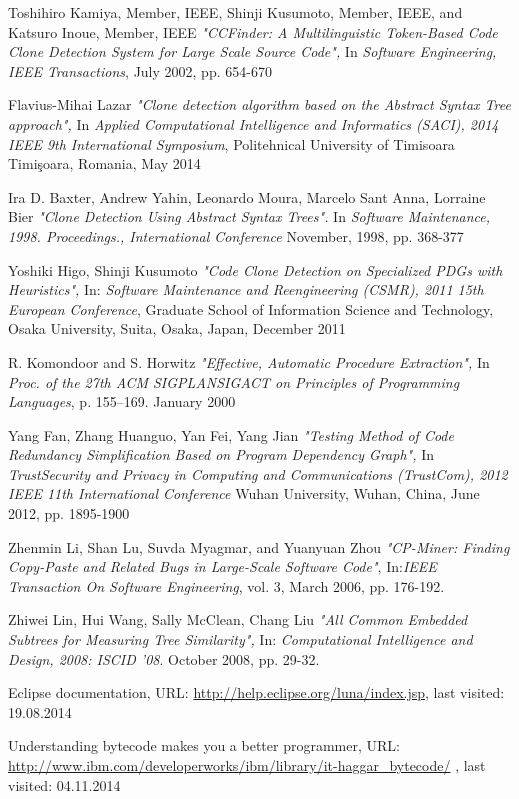 \documentclass{report}
\begin{document}
\begin{thebibliography}{100}
 Toshihiro Kamiya, Member, IEEE, Shinji Kusumoto, Member, IEEE, and Katsuro Inoue, Member, IEEE \emph{"CCFinder: A Multilinguistic Token-Based Code Clone Detection System for Large Scale Source Code",} In \emph{Software Engineering, IEEE Transactions},  July 2002, pp. 654-670

 Flavius-Mihai Lazar \emph{"Clone detection algorithm based on the Abstract Syntax Tree approach",} In \emph{Applied Computational Intelligence and Informatics (SACI), 2014 IEEE 9th International Symposium}, Politehnical University of Timisoara Timişoara, Romania, May 2014

 Ira D. Baxter, Andrew Yahin, Leonardo Moura, Marcelo Sant Anna, Lorraine Bier \emph{"Clone Detection Using Abstract Syntax Trees".} In \emph{Software Maintenance, 1998. Proceedings., International Conference} November, 1998, pp. 368-377

 Yoshiki Higo, Shinji Kusumoto \emph{"Code Clone Detection on Specialized PDGs with Heuristics",} In: \emph{Software Maintenance and Reengineering (CSMR), 2011 15th European Conference}, Graduate School of Information Science and Technology, Osaka University, Suita, Osaka, Japan, December 2011

 R. Komondoor and S. Horwitz \emph{"Effective, Automatic Procedure Extraction",} In \emph{Proc. of the 27th ACM SIGPLANSIGACT
on Principles of Programming Languages}, p. 155–169. January 2000

 Yang Fan, Zhang Huanguo, Yan Fei, Yang Jian \emph{"Testing Method of Code Redundancy Simplification Based on Program Dependency Graph", } 
In \emph{ TrustSecurity and Privacy in Computing and Communications (TrustCom), 2012 IEEE 11th International Conference }
Wuhan University, Wuhan, China, June 2012, pp. 1895-1900 

 Zhenmin Li, Shan Lu, Suvda Myagmar, and Yuanyuan Zhou \emph{"CP-Miner: Finding Copy-Paste and
Related Bugs in Large-Scale Software Code"}, In:\emph{IEEE Transaction On Software Engineering}, vol. 3, March 2006, pp. 176-192.

 Zhiwei Lin, Hui Wang, Sally McClean, Chang Liu \emph{"All Common Embedded Subtrees for Measuring Tree Similarity",} In:
\emph{Computational Intelligence and Design, 2008: ISCID '08}. October 2008, pp. 29-32.

 Eclipse documentation, URL: \url{http://help.eclipse.org/luna/index.jsp}, last visited: 19.08.2014

 Understanding bytecode makes you a better programmer, URL: \url{http://www.ibm.com/developerworks/ibm/library/it-haggar_bytecode/} , last visited: 04.11.2014

\end{thebibliography} 
\end{document}
